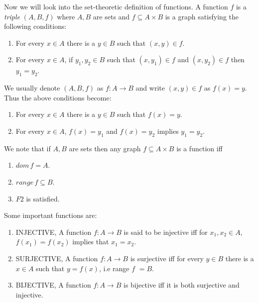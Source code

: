 Now we will look into the set-theoretic definition of functions.
A function $f$ is a \emph{triple} $\left(A,B,f\right)$ where $A,B$ are sets and $f \subseteq A
\times B$ is a graph satisfying the following conditions:
\begin{enumerate}[label=\bfseries F \arabic*:]
    \item For every $x \in A$ there is a $y \in B$ such that $(x,y) \in f$.
    \item For every $x \in A$, if $y_1,y_2 \in B$ such that $(x,y_1) \in f$ and $(x,y_2) \in f$ then
	$y_1 = y_2$.
\end{enumerate}

We usually denote $\left(A,B,f\right)$ as $ f : A \to B$ and write $(x,y) \in f$ as $f(x)= y$.
Thus the above conditions become:
\begin{enumerate}[label=\bfseries F \arabic*:]
    \item For every $x \in A$ there is a $y \in B$ such that $f(x) = y$.
    \item For every $x \in A$, $f(x) = y_1 $ and $f(x) = y_2$ implies $y_1 = y_2$. 
\end{enumerate}

We note that if $A,B$ are sets then any graph $f \subseteq A \times B$ is a function iff
\begin{enumerate}
    \item $dom\,f = A$.
    \item $range\,f \subseteq B$.
    \item $F2$ is satisfied.
\end{enumerate}

Some important functions are:
\begin{enumerate}
    \item INJECTIVE, A function $f : A \to B$ is said to be injective iff for $x_1,x_2 \in A$,
	$f(x_1) = f(x_2)$ implies that $x_1 = x_2$.
    \item SURJECTIVE, A function $f : A \to B$ is surjective iff for every $y \in B$ there is a $x
	\in A$ such that $y = f(x)$, i.e range $f$ $ = B$.
    \item BIJECTIVE, A function $f : A \to B$ is bijective iff it is both surjective and injective.
\end{enumerate}

